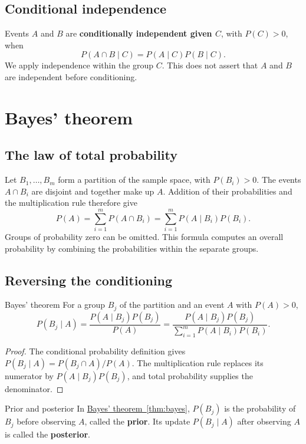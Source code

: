 \documentclass[a4paper,12pt,oneside]{report}
\begin{document}
\subsection{Conditional independence}
Events $A$ and $B$ are \textbf{conditionally independent given $C$},
with $P(C)>0$, when
\[
  P(A\cap B\mid C)=P(A\mid C)P(B\mid C).
\]
We apply independence within the group $C$. This does not assert
that $A$ and $B$ are independent before conditioning.

\section{Bayes' theorem}

\subsection{The law of total probability}
\label{sec:total-probability}
Let $B_1,\ldots,B_m$ form a partition of the sample space, with
$P(B_i)>0$. The events $A\cap B_i$ are disjoint and together make
up $A$. Addition of their probabilities and the multiplication
rule therefore give
\[
  P(A)=\sum_{i=1}^m P(A\cap B_i)
      =\sum_{i=1}^m P(A\mid B_i)P(B_i).
\]
Groups of probability zero can be omitted. This formula computes
an overall probability by combining the probabilities within
the separate groups.

\subsection{Reversing the conditioning}
\begin{framedthm}{Bayes' theorem}
\label{thm:bayes}
For a group $B_j$ of the partition and an event $A$ with $P(A)>0$,
\[
  P(B_j\mid A)
    =\frac{P(A\mid B_j)P(B_j)}{P(A)}
    =\frac{P(A\mid B_j)P(B_j)}
           {\sum_{i=1}^m P(A\mid B_i)P(B_i)}.
\]
\end{framedthm}
\begin{proof}
The conditional probability definition gives
$P(B_j\mid A)=P(B_j\cap A)/P(A)$. The multiplication rule
replaces its numerator by $P(A\mid B_j)P(B_j)$, and total
probability supplies the denominator.
\end{proof}

\begin{frameddefn}{Prior and posterior}
\label{def:prior-posterior}
In
\hyperref[thm:bayes]{Bayes' theorem~\ref{thm:bayes}},
$P(B_j)$ is the probability of $B_j$ before observing $A$, called
the \textbf{prior}. Its update $P(B_j\mid A)$ after observing $A$
is called the \textbf{posterior}.
\end{frameddefn}
\end{document}
